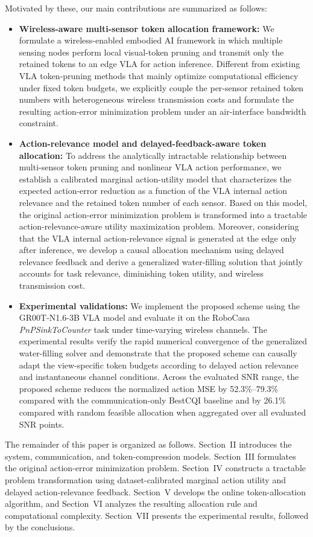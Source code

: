\documentclass[lettersize,journal]{IEEEtran}
\theoremstyle{custom}
\begin{document}
Motivated by these, our main contributions are summarized as follows: 
\begin{itemize}
    \item \textbf{Wireless-aware multi-sensor token allocation framework:}
    We formulate a wireless-enabled embodied AI framework in which multiple sensing nodes perform local visual-token pruning and transmit only the retained tokens to an edge VLA for action inference. 
    Different from existing VLA token-pruning methods that mainly optimize computational efficiency under fixed token budgets, we explicitly couple the per-sensor retained token numbers with heterogeneous wireless transmission costs and formulate the resulting action-error minimization problem under an air-interface bandwidth constraint.

    \item \textbf{Action-relevance model and delayed-feedback-aware token allocation:}
    To address the analytically intractable relationship between multi-sensor token pruning and nonlinear VLA action performance, we establish a calibrated marginal action-utility model that characterizes the expected action-error reduction as a function of the VLA internal action relevance and the retained token number of each sensor.
    Based on this model, the original action-error minimization problem is transformed into a tractable action-relevance-aware utility maximization problem.
    Moreover, considering that the VLA internal action-relevance signal is generated at the edge only after inference, we develop a causal allocation mechanism using delayed relevance feedback and derive a generalized water-filling solution that jointly accounts for task relevance, diminishing token utility, and wireless transmission cost.

    \item \textbf{Experimental validations:}  
    We implement the proposed scheme using the GR00T-N1.6-3B VLA model and evaluate it on the RoboCasa \emph{PnPSinkToCounter} task under time-varying wireless channels. The experimental results verify the rapid numerical convergence of the generalized water-filling solver and demonstrate that the proposed scheme can causally adapt the view-specific token budgets according to delayed action relevance and instantaneous channel conditions. Across the evaluated SNR range, the proposed scheme reduces the normalized action MSE by 52.3\%--79.3\% compared with the communication-only BestCQI baseline and by 26.1\% compared with random feasible allocation when aggregated over all evaluated SNR points. 

\end{itemize}
The remainder of this paper is organized as follows. Section~II introduces the system, communication, and token-compression models. Section~III formulates the original action-error minimization problem. Section~IV constructs a tractable problem transformation using dataset-calibrated marginal action utility and delayed action-relevance feedback. Section~V develops the online token-allocation algorithm, and Section~VI analyzes the resulting allocation rule and computational complexity. Section~VII presents the experimental results, followed by the conclusions.
\end{document}
